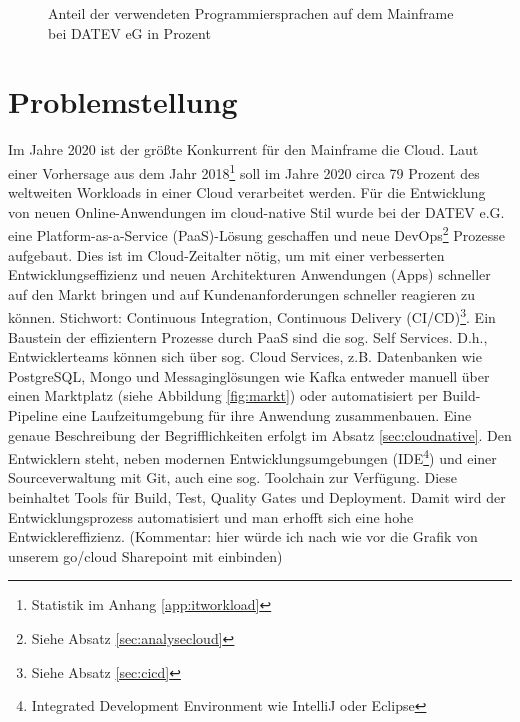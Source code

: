 \begin{figure}
\centering
\caption{Anteil der verwendeten Programmiersprachen auf dem Mainframe bei DATEV eG in Prozent}
\label{fig:Programmiersprachen}
\end{figure}

\section{Problemstellung}\label{sec:probstell}
Im Jahre 2020 ist der größte Konkurrent für den Mainframe die Cloud.
Laut einer Vorhersage aus dem Jahr 2018\footnote{Statistik im Anhang \ref{app:itworkload}} soll im Jahre 2020 circa 79 Prozent des weltweiten Workloads in einer Cloud verarbeitet werden.
Für die Entwicklung von neuen Online-Anwendungen im cloud-native Stil wurde bei der DATEV e.G. eine Platform-as-a-Service (PaaS)-Lösung geschaffen und neue DevOps\footnote{Siehe Absatz \ref{sec:analysecloud}} Prozesse aufgebaut.
Dies ist im Cloud-Zeitalter nötig, um mit einer verbesserten Entwicklungseffizienz und neuen Architekturen Anwendungen (\glqq Apps\grqq) schneller auf den Markt bringen und auf Kundenanforderungen schneller reagieren zu können. Stichwort: Continuous Integration, Continuous Delivery (CI/CD)\footnote{Siehe Absatz \ref{sec:cicd}}.
Ein Baustein der effizientern Prozesse durch PaaS sind die sog. \glqq Self Services\grqq.
D.h., Entwicklerteams können sich über sog. \glqq Cloud Services\grqq, z.B. Datenbanken wie PostgreSQL, Mongo und Messaginglösungen wie Kafka entweder manuell über einen Marktplatz (siehe Abbildung \ref{fig:markt}) oder automatisiert per \glqq Build-Pipeline\grqq{} eine  Laufzeitumgebung für ihre Anwendung zusammenbauen.
Eine genaue Beschreibung der Begrifflichkeiten erfolgt im Absatz \ref{sec:cloudnative}.
Den Entwicklern steht, neben modernen Entwicklungsumgebungen (IDE\footnote{Integrated Development Environment wie IntelliJ oder Eclipse}) und einer Sourceverwaltung mit Git, auch eine sog. \glqq Toolchain\grqq{} zur Verfügung. Diese beinhaltet Tools für Build, Test, Quality Gates und Deployment. 
Damit wird der Entwicklungsprozess automatisiert und man erhofft sich eine hohe Entwicklereffizienz. (Kommentar: hier würde ich nach wie vor die Grafik von unserem go/cloud Sharepoint mit einbinden)

